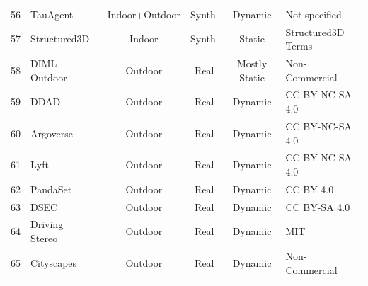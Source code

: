 \begin{table}[h]
\begin{tabularx}{\textwidth}{@{}c >{\centering\arraybackslash}X c c c >{\centering\arraybackslash}X@{}}
56 & TauAgent~\cite{gil2021online} & Indoor+Outdoor & Synth. & Dynamic & Not specified \\
57 & Structured3D~\cite{zheng2020structured3d} & Indoor & Synth. & Static & Structured3D Terms \\
58 & DIML Outdoor~\cite{cho2021diml} & Outdoor & Real & Mostly Static & Non-Commercial \\
59 & DDAD~\cite{guizilini2020packnet} & Outdoor & Real & Dynamic & CC BY-NC-SA 4.0 \\
60 & Argoverse~\cite{chang2019argoverse} & Outdoor & Real & Dynamic & CC BY-NC-SA 4.0 \\
61 & Lyft~\cite{houston2021one} & Outdoor & Real & Dynamic & CC BY-NC-SA 4.0 \\
62 & PandaSet~\cite{xiao2021pandaset} & Outdoor & Real & Dynamic & CC BY 4.0 \\
63 & DSEC~\cite{gehrig2021dsec} & Outdoor & Real & Dynamic & CC BY-SA 4.0 \\
64 & Driving Stereo~\cite{yang2019drivingstereo} & Outdoor & Real & Dynamic & MIT \\
65 & Cityscapes~\cite{cordts2016cityscapes} & Outdoor & Real & Dynamic & Non-Commercial \\
\bottomrule
\end{tabularx}
\end{table}